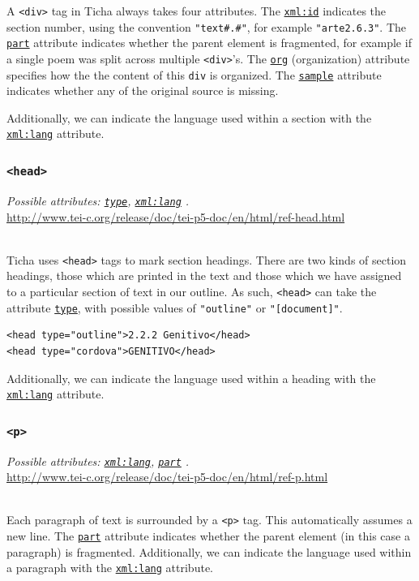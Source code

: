\documentclass[12pt,a4paper]{article}
\newcommand{\taglinks}[2]{
\vspace*{-0.5ex}
\hspace*{\parindent}
\begin{minipage}{\textwidth}
  \emph{Possible attributes: #1.} \\ \url{#2} \end{minipage} \vspace{0.5ex} \\ }
\begin{document}
A \texttt{<div>} tag in Ticha always takes four attributes.  The \hyperref[att-sec:xml:id]{\texttt{xml:id}} indicates the section number, using the convention \texttt{"text\#.\#"}, for example \texttt{"arte2.6.3"}.  The \hyperref[att-sec:part]{\texttt{part}} attribute indicates whether  the parent element is fragmented, for example if a single poem was split across multiple \texttt{<div>}'s.  The \hyperref[att-sec:org]{\texttt{org}} (organization) attribute specifies how the the content of this \texttt{div} is organized.  The \hyperref[att-sec:sample]{\texttt{sample}} attribute indicates whether any of the original source is missing.

Additionally, we can indicate the language used within a section with the \hyperref[att-sec:xml:lang]{\texttt{xml:lang}} attribute.


\subsubsection{\texttt{<head>} } \label{tag-sec:head}

\taglinks{
\hyperref[att-sec:type]{\texttt{type}},
\hyperref[att-sec:xml:lang]{\texttt{xml:lang}}
}
{http://www.tei-c.org/release/doc/tei-p5-doc/en/html/ref-head.html}
%
Ticha uses \texttt{<head>} tags to mark section headings.  There are two kinds of section headings, those which are printed in the text and those which we have assigned to a particular section of text in our outline.  As such, \texttt{<head>} can take the attribute \hyperref[att-sec:type]{\texttt{type}}, with possible values of \texttt{"outline"} or \texttt{"[document]"}.

\begin{lstlisting}
<head type="outline">2.2.2 Genitivo</head>
<head type="cordova">GENITIVO</head>
\end{lstlisting}

Additionally, we can indicate the language used within a heading with the \hyperref[att-sec:xml:lang]{\texttt{xml:lang}} attribute.

\subsubsection{\texttt{<p>}} \label{tag-sec:p}
\taglinks{
\hyperref[att-sec:xml:lang]{\texttt{xml:lang}}, 
\hyperref[att-sec:part]{\texttt{part}}
}
{http://www.tei-c.org/release/doc/tei-p5-doc/en/html/ref-p.html}
Each paragraph of text is surrounded by a \texttt{<p>} tag.  This automatically assumes a new line.  The \hyperref[att-sec:part]{\texttt{part}} attribute indicates whether the parent element (in this case a paragraph) is fragmented.  Additionally, we can indicate the language used within a paragraph with the \hyperref[att-sec:xml:lang]{\texttt{xml:lang}} attribute.
\end{document}
